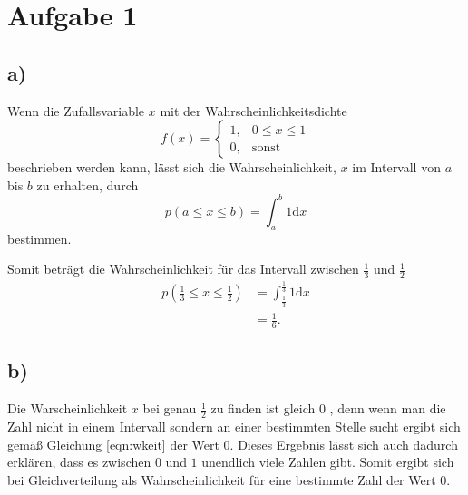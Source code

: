 \newpage
\section{Aufgabe 1}
\label{sec:a1}

\subsection{a)}
\label{subsec:a1a}
Wenn die Zufallsvariable $x$ mit der Wahrscheinlichkeitsdichte
\\
\begin{equation}
  \label{eqn:dichte}
  f\left( x \right) =
  \begin{cases}
     1 , & 0 \le x \le 1 \\
     0 , & \text{sonst}
  \end{cases}
\end{equation}
beschrieben werden kann, lässt sich die Wahrscheinlichkeit, $x$ im Intervall von $a$
bis $b$ zu erhalten, durch
\\
\begin{equation}
  \label{eqn:wkeit}
  p\left( a \le x \le b \right) = \int_{a}^{b} 1 \mathrm{d}x
\end{equation}
bestimmen.


Somit beträgt die Wahrscheinlichkeit für das Intervall zwischen $\frac{1}{3}$ und $\frac{1}{2}$
\\
\begin{align*}
  p\left( \frac{1}{3} \le x \le \frac{1}{2} \right) &= \int_{\frac{1}{3}}^{\frac{1}{3}}
  1 \mathrm{d}x \\
  &= \frac{1}{6}.
\end{align*}

\subsection{b)}
\label{subsec:a1b}
Die Warscheinlichkeit $x$ bei genau $\frac{1}{2}$ zu finden ist gleich $0$ , denn wenn
man die Zahl nicht in einem Intervall sondern an einer bestimmten Stelle
sucht ergibt sich gemäß Gleichung \eqref{eqn:wkeit} der Wert $0$. Dieses Ergebnis lässt sich auch dadurch
erklären, dass es zwischen $0$ und $1$ unendlich viele Zahlen gibt. Somit ergibt sich bei Gleichverteilung
als Wahrscheinlichkeit für eine bestimmte Zahl der Wert $0$.

